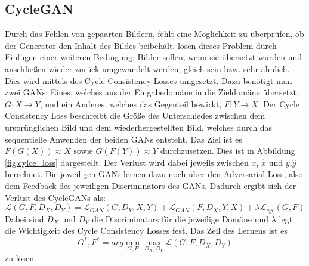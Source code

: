  \subsection{CycleGAN}%
 \label{sub:cyclegan}
 Durch das Fehlen von gepaarten Bildern, fehlt eine Möglichkeit zu überprüfen, ob der Generator den Inhalt des Bildes beibehält. \citeauthor{zhu2017unpaired} \cite{zhu2017unpaired} lösen dieses Problem durch Einfügen einer weiteren Bedingung: Bilder sollen, wenn sie übersetzt wurden und anschließen wieder zurück umgewandelt werden, gleich sein bzw. sehr ähnlich. Dies wird mittels des Cycle Consistency Losses umgesetzt. 
 Dazu benötigt man zwei GANs: Eines, welches aus der Eingabedomäne in die Zieldomäne übersetzt, $G: X \rightarrow Y$, und ein Anderes, welches das Gegenteil bewirkt,   $F: Y \rightarrow X$.
 Der Cycle Consistency Loss beschreibt die Größe des Unterschiedes zwischen dem
 ursprünglichen Bild und dem wiederhergestellten Bild, welches durch das
 sequentielle Anwenden der beiden GANs entsteht. 
 Das Ziel ist es $F(G(X))\approx X$ sowie $G(F(Y))\approx Y$ durchzusetzen. Dies
 ist in Abbildung \ref{fig:cylce_loss} dargestellt. Der Verlust wird dabei jeweils
 zwischen
 $x$, $\hat{x}$ und $y$,$\hat{y}$ berechnet.
 Die jeweiligen GANs lernen dazu noch über den Adversarial Loss, also dem Feedback des jeweiligen Discriminators des GANs. 
 Dadurch ergibt sich der Verlust des CycleGANs als:
 \[ \mathcal{L}(G,F,D_X,D_Y) = 	\mathcal{L}_{GAN}(G,D_Y,X,Y) + 	\mathcal{L}_{GAN}(F, D_X,Y,X) +\lambda 	\mathcal{L}_{cyc}(G,F)   \]
 Dabei sind $D_X$ und $D_Y$ die Discriminators für die jeweilige Domäne und
 $\lambda$ legt die Wichtigkeit des Cycle Consistency Losses fest. 
 Das Zeil des Lernens ist es 
 \[G^*,F^* = arg \min_{G,F} \max_{D_X,D_Y} \mathcal{L}(G,F,D_X,D_Y) \] zu lösen.
 
